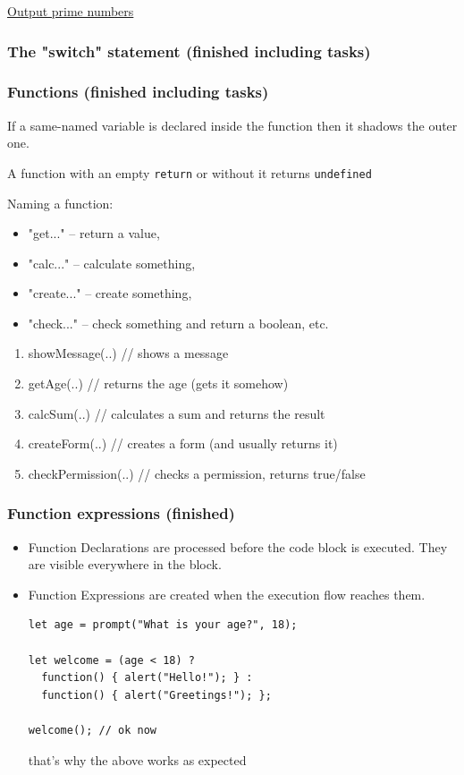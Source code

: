 \documentclass[a4paper, 12pt]{article}
\begin{document}
\href{https://javascript.info/while-for#output-prime-numbers}{Output prime numbers}

\subsubsection{The "switch" statement (finished including tasks)}

\subsubsection{Functions (finished including tasks)}
If a same-named variable is declared inside the function then it shadows the outer one.

A function with an empty \verb|return| or without it returns \verb|undefined|

Naming a function:
\begin{itemize}
\item "get..." – return a value,
\item "calc..." – calculate something,
\item "create..." – create something,
\item "check..." – check something and return a boolean, etc.
\end{itemize}
\begin{enumerate}
\item showMessage(..)     // shows a message
\item getAge(..)          // returns the age (gets it somehow)
\item calcSum(..)         // calculates a sum and returns the result
\item createForm(..)      // creates a form (and usually returns it)
\item checkPermission(..) // checks a permission, returns true/false
\end{enumerate}

\subsubsection{Function expressions (finished)}
\begin{itemize}
\item Function Declarations are processed before the code block is executed. They are visible everywhere in the block.

\item Function Expressions are created when the execution flow reaches them.
\begin{verbatim}
let age = prompt("What is your age?", 18);

let welcome = (age < 18) ?
  function() { alert("Hello!"); } :
  function() { alert("Greetings!"); };

welcome(); // ok now
\end{verbatim}
that's why the above works as expected

\end{itemize}
\end{document}
